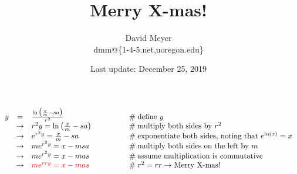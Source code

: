 \documentclass[11pt, oneside]{article}   	%
\title{Merry X-mas!}
\author{David Meyer \\ dmm@\{1-4-5.net,uoregon.edu\}}
\date{Last update: December 25, 2019}							%
\theoremstyle{definition}
\begin{document}
\maketitle

\begin{equation*}
\begin{array}{rcll} 
y
&=& \frac{\ln \big (\frac{x}{m} -  sa  \big ) }{r^2}                                      &\qquad \qquad \mathrel{\#} \text{define $y$}                                                                   \\
&\rightarrow& r^2 y                          = \ln \big (\frac{x}{m} -  sa  \big )    &\qquad \qquad  \mathrel{\#} \text{multiply both sides by $r^2$}                                       \\
&\rightarrow& e^{r^2y}                     = \frac{x}{m} -  sa                           &\qquad \qquad \mathrel{\#} \text{exponentiate both sides, noting that $e^{\ln(x)} = x$}  \\
&\rightarrow& m e^{r^2y}                 = x - msa                                        &\qquad \qquad \mathrel{\#} \text{multiply both sides on the left by $m$}                         \\
&\rightarrow& m e^{r^2y}                 = x - mas                                        &\qquad \qquad \mathrel{\#} \text{assume multiplication is commutative}                         \\
&\rightarrow& \color{red}{m e^{rry}  = x - mas}                                       &\qquad \qquad \mathrel{\#} \text{$r^2 = rr \rightarrow$ Merry X-mas!}
\end{array}
\end{equation*}
\end{document}
